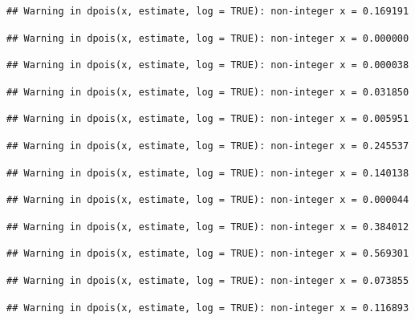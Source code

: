 \documentclass[]{article}
\begin{document}
\begin{verbatim}
## Warning in dpois(x, estimate, log = TRUE): non-integer x = 0.169191
\end{verbatim}

\begin{verbatim}
## Warning in dpois(x, estimate, log = TRUE): non-integer x = 0.000000
\end{verbatim}

\begin{verbatim}
## Warning in dpois(x, estimate, log = TRUE): non-integer x = 0.000038
\end{verbatim}

\begin{verbatim}
## Warning in dpois(x, estimate, log = TRUE): non-integer x = 0.031850
\end{verbatim}

\begin{verbatim}
## Warning in dpois(x, estimate, log = TRUE): non-integer x = 0.005951
\end{verbatim}

\begin{verbatim}
## Warning in dpois(x, estimate, log = TRUE): non-integer x = 0.245537
\end{verbatim}

\begin{verbatim}
## Warning in dpois(x, estimate, log = TRUE): non-integer x = 0.140138
\end{verbatim}

\begin{verbatim}
## Warning in dpois(x, estimate, log = TRUE): non-integer x = 0.000044
\end{verbatim}

\begin{verbatim}
## Warning in dpois(x, estimate, log = TRUE): non-integer x = 0.384012
\end{verbatim}

\begin{verbatim}
## Warning in dpois(x, estimate, log = TRUE): non-integer x = 0.569301
\end{verbatim}

\begin{verbatim}
## Warning in dpois(x, estimate, log = TRUE): non-integer x = 0.073855
\end{verbatim}

\begin{verbatim}
## Warning in dpois(x, estimate, log = TRUE): non-integer x = 0.116893
\end{verbatim}
\end{document}
